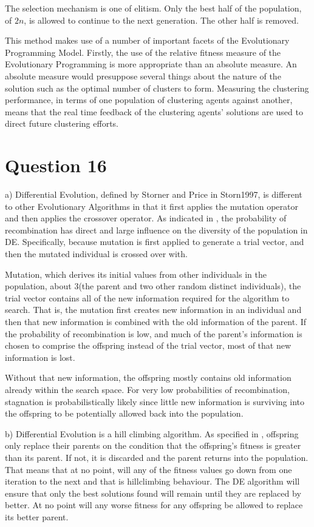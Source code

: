 \documentclass[12pt]{article}
\begin{document}
The selection mechanism is one of elitism. Only the best half of the population, of $2n$, is allowed to continue to the next generation. The other half is removed.

This method makes use of a number of important facets of the Evolutionary Programming Model. Firstly, the use of the relative fitness measure of the Evolutionary Programming is more appropriate than an absolute measure. An absolute measure would presuppose several things about the nature of the solution such as the optimal number of clusters to form. Measuring the clustering performance, in terms of one population of clustering agents against another, means that the real time feedback of the clustering agents' solutions are used to direct future clustering efforts.
\section{Question 16}
a) Differential Evolution, defined by Storner and Price in {Storn1997}, is different to other Evolutionary Algorithms in that it first applies the mutation operator and then applies the crossover operator. As indicated in \cite{engelCI02}, the probability of recombination has direct and large influence on the diversity of the population in DE. Specifically, because mutation is first applied to generate a trial vector, and then the mutated individual is crossed over with. 

	Mutation, which derives its initial values from other individuals in the population, about 3(the parent and two other random distinct individuals), the trial vector contains all of the new information required for the algorithm to search. That is, the mutation first creates new information in an individual and then that new information is combined with the old information of the parent. If the probability of recombination is low, and much of the parent's information is chosen to comprise the offspring instead of the trial vector, most of that new information is lost.

	Without that new information, the offspring mostly contains old information already within the search space. For very low probabilities of recombination, stagnation is probabilistically likely since little new information is surviving into the offspring to be potentially allowed back into the population.

	b) Differential Evolution is a hill climbing algorithm. As specified in \cite{Storn1997}, offspring only replace their parents on the condition that the offspring's fitness is greater than its parent. If not, it is discarded and the parent returns into the population. That means that at no point, will any of the fitness values go down from one iteration to the next and that is hillclimbing behaviour. The DE algorithm will ensure that only the best solutions found will remain until they are replaced by better. At no point will any worse fitness for any offspring be allowed to replace its better parent.
\end{document}
